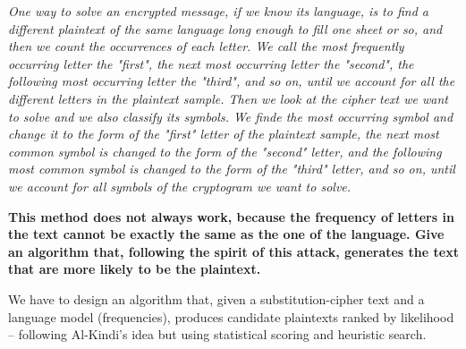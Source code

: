 \documentclass[]{article}
\numberwithin{figure}{section}
\begin{document}
\medskip

\noindent
\textit{One way to solve an encrypted message, if we know its language, is to find a different plaintext of the same language long enough to fill one sheet or so, and then we count the occurrences of each letter. We call the most frequently occurring letter the "first", the next most occurring letter the "second", the following most occurring letter the "third", and so on, until we account for all the different letters in the plaintext sample. Then we look at the cipher text we want to solve and we also classify its symbols. We finde the most occurring symbol and change it to the form of the "first" letter of the plaintext sample, the next most common symbol is changed to the form of the "second" letter, and the following most common symbol is changed to the form of the "third" letter, and so on, until we account for all symbols of the cryptogram we want to solve.} 

\medskip \noindent
\textbf{This method does not always work, because the frequency of letters in the text cannot be exactly the same as the one of the language. Give an algorithm that, following the spirit of this attack, generates the text that are more likely to be the plaintext.}

\medskip \noindent
We have to design an algorithm that, given a substitution-cipher text and a language model (frequencies), produces candidate plaintexts ranked by likelihood -- following Al-Kindi's idea but using statistical scoring and heuristic search. \\
\end{document}

